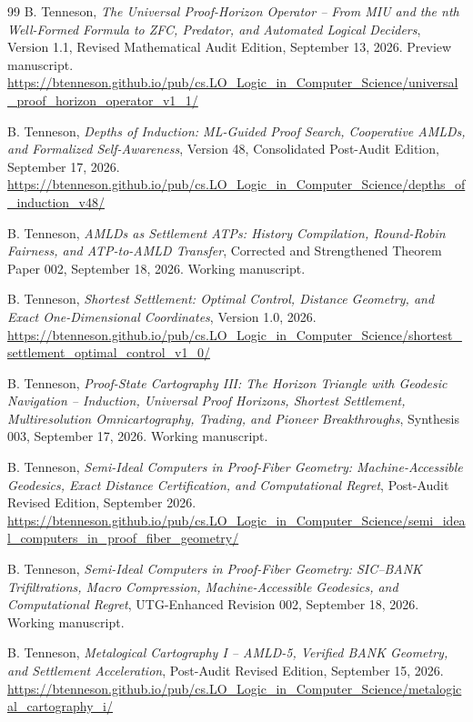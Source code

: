 \documentclass[11pt]{article}
\theoremstyle{definition}
\begin{document}
\begin{thebibliography}{99}
B. Tenneson, \emph{The Universal Proof-Horizon Operator -- From MIU and the nth Well-Formed Formula to ZFC, Predator, and Automated Logical Deciders}, Version 1.1, Revised Mathematical Audit Edition, September 13, 2026. Preview manuscript.\\
\url{https://btenneson.github.io/pub/cs.LO_Logic_in_Computer_Science/universal_proof_horizon_operator_v1_1/}

B. Tenneson, \emph{Depths of Induction: ML-Guided Proof Search, Cooperative AMLDs, and Formalized Self-Awareness}, Version 48, Consolidated Post-Audit Edition, September 17, 2026.\\
\url{https://btenneson.github.io/pub/cs.LO_Logic_in_Computer_Science/depths_of_induction_v48/}

B. Tenneson, \emph{AMLDs as Settlement ATPs: History Compilation, Round-Robin Fairness, and ATP-to-AMLD Transfer}, Corrected and Strengthened Theorem Paper 002, September 18, 2026. Working manuscript.

B. Tenneson, \emph{Shortest Settlement: Optimal Control, Distance Geometry, and Exact One-Dimensional Coordinates}, Version 1.0, 2026.\\
\url{https://btenneson.github.io/pub/cs.LO_Logic_in_Computer_Science/shortest_settlement_optimal_control_v1_0/}

B. Tenneson, \emph{Proof-State Cartography III: The Horizon Triangle with Geodesic Navigation -- Induction, Universal Proof Horizons, Shortest Settlement, Multiresolution Omnicartography, Trading, and Pioneer Breakthroughs}, Synthesis 003, September 17, 2026. Working manuscript.

B. Tenneson, \emph{Semi-Ideal Computers in Proof-Fiber Geometry: Machine-Accessible Geodesics, Exact Distance Certification, and Computational Regret}, Post-Audit Revised Edition, September 2026.\\
\url{https://btenneson.github.io/pub/cs.LO_Logic_in_Computer_Science/semi_ideal_computers_in_proof_fiber_geometry/}

B. Tenneson, \emph{Semi-Ideal Computers in Proof-Fiber Geometry: SIC--BANK Trifiltrations, Macro Compression, Machine-Accessible Geodesics, and Computational Regret}, UTG-Enhanced Revision 002, September 18, 2026. Working manuscript.

B. Tenneson, \emph{Metalogical Cartography I -- AMLD-5, Verified BANK Geometry, and Settlement Acceleration}, Post-Audit Revised Edition, September 15, 2026.\\
\url{https://btenneson.github.io/pub/cs.LO_Logic_in_Computer_Science/metalogical_cartography_i/}


\end{thebibliography}
\end{document}
